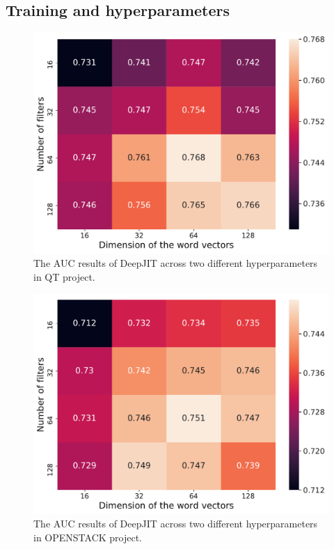 \subsection{Training and hyperparameters}
\label{sec:training_parameters}
\begin{figure}[t!]
    \center
    \includegraphics[width=\linewidth]{figs/QT.pdf}
    \caption{The AUC results of DeepJIT across two different hyperparameters in QT project.}
    \label{fig:qt}
\end{figure}
\begin{figure}[t!]
    \center
    \includegraphics[width=\linewidth]{figs/OPENSTACK.pdf}
    \caption{The AUC results of DeepJIT across two different hyperparameters in OPENSTACK project.}
    \label{fig:openstack}
\end{figure}

